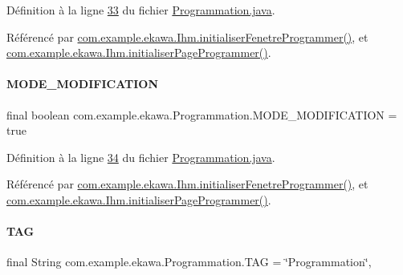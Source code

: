 Définition à la ligne \hyperlink{_programmation_8java_source_l00033}{33} du fichier \hyperlink{_programmation_8java_source}{Programmation.\+java}.



Référencé par \hyperlink{_ihm_8java_source_l00727}{com.\+example.\+ekawa.\+Ihm.\+initialiser\+Fenetre\+Programmer()}, et \hyperlink{_ihm_8java_source_l00668}{com.\+example.\+ekawa.\+Ihm.\+initialiser\+Page\+Programmer()}.

\mbox{\label{classcom_1_1example_1_1ekawa_1_1_programmation_a33fb0a465e66ba5854a07e3050c12c04}} 
\paragraph{\texorpdfstring{M\+O\+D\+E\+\_\+\+M\+O\+D\+I\+F\+I\+C\+A\+T\+I\+ON}{MODE\_MODIFICATION}}
{\footnotesize\ttfamily final boolean com.\+example.\+ekawa.\+Programmation.\+M\+O\+D\+E\+\_\+\+M\+O\+D\+I\+F\+I\+C\+A\+T\+I\+ON = true\hspace{0.3cm}{\ttfamily [static]}}



Définition à la ligne \hyperlink{_programmation_8java_source_l00034}{34} du fichier \hyperlink{_programmation_8java_source}{Programmation.\+java}.



Référencé par \hyperlink{_ihm_8java_source_l00727}{com.\+example.\+ekawa.\+Ihm.\+initialiser\+Fenetre\+Programmer()}, et \hyperlink{_ihm_8java_source_l00668}{com.\+example.\+ekawa.\+Ihm.\+initialiser\+Page\+Programmer()}.

\mbox{\label{classcom_1_1example_1_1ekawa_1_1_programmation_a85d255c2386eb6751905a45dba634742}} 
\paragraph{\texorpdfstring{T\+AG}{TAG}}
{\footnotesize\ttfamily final String com.\+example.\+ekawa.\+Programmation.\+T\+AG = \char`\"{}Programmation\char`\"{}\hspace{0.3cm}{\ttfamily [static]}, {\ttfamily [private]}}

